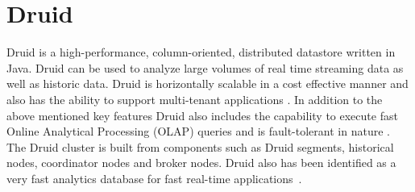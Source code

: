 \section{Druid}

Druid is a high-performance, column-oriented, distributed datastore written in 
Java. Druid can be used to analyze large volumes of real time streaming data as 
well as historic data. Druid is horizontally scalable in a cost effective 
manner and also has the ability to support multi-tenant applications 
\cite{hid-sp18-416-www-druid-wikipedia}. In addition to the above mentioned key 
features Druid also includes the capability to execute fast Online Analytical 
Processing (OLAP) queries and is fault-tolerant in nature 
\cite{hid-sp18-416-www-about-druid}. The Druid cluster is built from components 
such as Druid segments, historical nodes, coordinator nodes and broker nodes. 
Druid also has been identified as a very fast analytics database for fast 
real-time applications~\cite{hid-sp18-416-www-fast-dataanalytics-druid-blog}.